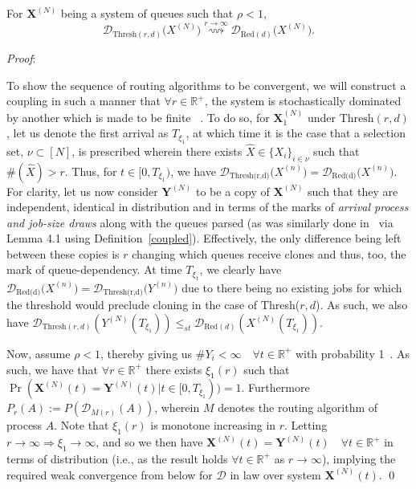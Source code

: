 \begin{lemma}
    \label{sup}
    For $\mathbf{X}^{(N)}$ being a system of queues such that $\rho < 1$,
    \normalfont \[\mathcal{D}_{\text{Thresh}(r,d)}\mathbf(X^{(N)}) \overset{r \rightarrow \infty}{\rightsquigarrow} \mathcal{D}_{\text{Red}(d)}\mathbf(X^{(N)}).\]
\end{lemma}
\textit{Proof}:

To show the sequence of routing algorithms to be convergent, we will construct a coupling in such a manner that $\forall r \in \mathbb{R}^{+}$, the system is stochastically dominated by another which is made to be finite~\cite{baccelli_elements_2003} . To do so, for $\mathbf{X}_{1}^{(N)}$ under $\text{Thresh}(r,d)$, let us denote the first arrival as $T_{\xi_{1}}$, at which time it is the case that a selection set, $\nu \subset [N] $, is prescribed wherein there exists $\hat X \in \{X_{i}\}_{i \in \nu} $ such that $ \# (\hat X) > r $. Thus, for  $ t \in [0,T_{\xi_{1}})$, we have $\mathcal{D}_{\text{Thresh(r,d)}}\mathbf(X^{(n)}) = \mathcal{D}_{\text{Red(d)}}\mathbf(X^{(n)})$. For clarity, let us now consider $\mathbf{Y}^{(N)}$ to be a copy of  $\mathbf{X}^{(N)}$ such that they are independent, identical in distribution and in terms of the marks of \textit{arrival process and job-size draws} along with the queues parsed (as was similarly done in~\cite{bramson_asymptotic_2012} via Lemma 4.1 using Definition~\ref{coupled}). Effectively, the only difference being left between these copies is $r$ changing which queues receive clones and thus, too, the mark of queue-dependency.
At time $T_{\xi_{1}}$, we clearly have $\mathcal{D}_{\text{Red(d)}}\mathbf(X^{(n)}) = \mathcal{D}_{\text{Thresh(r,d)}}\mathbf(Y^{(n)})$ due to there being no existing jobs for which the threshold would preclude cloning in the case of Thresh($r,d$).
As such, we also have $\mathcal{D}_{\text{Thresh}(r,d)}(Y^{(N)}(T_{\xi_{1}}))\leq_{st}\mathcal{D}_{\text{Red}(d)}(X^{(N)}(T_{\xi_{1}}))$.

Now, assume $\rho < 1$, thereby giving us $ \# Y_{i}  < \infty \quad \forall t \in \mathbb{R}^{+}$ with probability 1~\cite{gardner_redundancy-d_2017}. As such, we have that $\forall r \in \mathbb{R}^{+}$ there exists $ \xi_{1}(r) $ such that $ \Pr(\mathbf{X}^{(N)} (t) = \mathbf{Y}^{(N)}(t) |t \in [0,T_{\xi_{1}})) = 1$.
Furthermore $P_{r}(A) := P(\mathcal{D}_{M(r)}(A))$, wherein $M$ denotes the routing algorithm of process $A$. Note that $\xi_{1} (r)$ is monotone increasing in $r$. Letting $r \rightarrow \infty \Rightarrow \xi_{1} \rightarrow \infty$, and so we then have $\mathbf{X}^{(N)}(t) =  \mathbf{Y}^{(N)}(t) \quad \forall t \in \mathbb{R}^{+}$ in terms of distribution (i.e., as the result holds $\forall t \in \mathbb{R}^{+}$ as $r\rightarrow \infty$), implying the required weak convergence from below for $\mathcal{D}$ in law over system  $\mathbf{X}^{(N)}(t)$.  \qed

